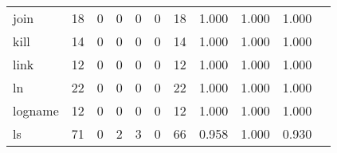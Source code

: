 \begin{longtable}{lp{1.2cm}p{1.2cm}p{1.2cm}p{1.2cm}p{1.2cm}p{1.2cm}p{1.2cm}p{1.2cm}p{1.2cm}p{1.2cm}}
join      &                                    18 &                                                  0 &                                                  0 &                                                  0 &                                                  0 &                                                 18 &                                         1.000 &                                              1.000 &                                              1.000 \\
kill      &                                    14 &                                                  0 &                                                  0 &                                                  0 &                                                  0 &                                                 14 &                                         1.000 &                                              1.000 &                                              1.000 \\
link      &                                    12 &                                                  0 &                                                  0 &                                                  0 &                                                  0 &                                                 12 &                                         1.000 &                                              1.000 &                                              1.000 \\
ln        &                                    22 &                                                  0 &                                                  0 &                                                  0 &                                                  0 &                                                 22 &                                         1.000 &                                              1.000 &                                              1.000 \\
logname   &                                    12 &                                                  0 &                                                  0 &                                                  0 &                                                  0 &                                                 12 &                                         1.000 &                                              1.000 &                                              1.000 \\
ls        &                                    71 &                                                  0 &                                                  2 &                                                  3 &                                                  0 &                                                 66 &                                         0.958 &                                              1.000 &                                              0.930 \\

\end{longtable}
